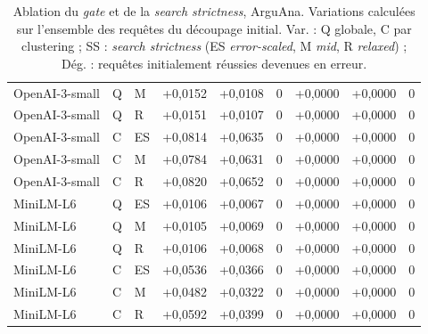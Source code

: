 \documentclass[a4paper,10pt]{article}
\begin{document}
\begin{table}[p]
\begin{tabular}{lllrrrrrr}
OpenAI-3-small & Q & M & +0,0152 & +0,0108 & 0 & +0,0000 & +0,0000 & 0 \\
OpenAI-3-small & Q & R & +0,0151 & +0,0107 & 0 & +0,0000 & +0,0000 & 0 \\
OpenAI-3-small & C & ES & +0,0814 & +0,0635 & 0 & +0,0000 & +0,0000 & 0 \\
OpenAI-3-small & C & M & +0,0784 & +0,0631 & 0 & +0,0000 & +0,0000 & 0 \\
OpenAI-3-small & C & R & +0,0820 & +0,0652 & 0 & +0,0000 & +0,0000 & 0 \\
\midrule
MiniLM-L6 & Q & ES & +0,0106 & +0,0067 & 0 & +0,0000 & +0,0000 & 0 \\
MiniLM-L6 & Q & M & +0,0105 & +0,0069 & 0 & +0,0000 & +0,0000 & 0 \\
MiniLM-L6 & Q & R & +0,0106 & +0,0068 & 0 & +0,0000 & +0,0000 & 0 \\
MiniLM-L6 & C & ES & +0,0536 & +0,0366 & 0 & +0,0000 & +0,0000 & 0 \\
MiniLM-L6 & C & M & +0,0482 & +0,0322 & 0 & +0,0000 & +0,0000 & 0 \\
MiniLM-L6 & C & R & +0,0592 & +0,0399 & 0 & +0,0000 & +0,0000 & 0 \\
\bottomrule
\end{tabular}
\caption{Ablation du \textit{gate} et de la \textit{search strictness}, ArguAna. Variations calculées sur l'ensemble des requêtes du découpage initial. Var. : Q globale, C par clustering ; SS : \textit{search strictness} (ES \textit{error-scaled}, M \textit{mid}, R \textit{relaxed}) ; Dég. : requêtes initialement réussies devenues en erreur.}
\label{tab:s-ablation-arguana}
\end{table}
\end{document}
